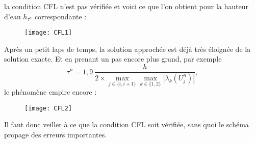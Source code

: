 \documentclass[
11pt, %
francais, %
singlespacing, %
headsepline, %
]{MastersDoctoralThesis} %
\theoremstyle{definition}
\begin{document}
la condition CFL n'est pas vérifiée et voici ce que l'on obtient pour la hauteur d'eau $h_{\tau^{n}}$ correspondante :

\begin{figure}
\centering
\texttt{[image: CFL1]}
\end{figure}

Après un petit laps de temps, la solution approchée est déjà très éloignée de la solution exacte. Et en prenant un pas encore plus grand, par exemple $$\tau^{n}=1,9~\frac{h}{2\times\underset{j\in \{i,i+1\}}{\max} \underset{k\in\{1,2\}}{\max} |\lambda_{k}(U_{j}^{n}) |},$$ le phénomène empire encore :

\begin{figure}
\centering
\texttt{[image: CFL2]}
\end{figure}

Il faut donc veiller à ce que la condition CFL soit vérifiée, sans quoi le schéma propage des erreurs importantes.
\end{document}

